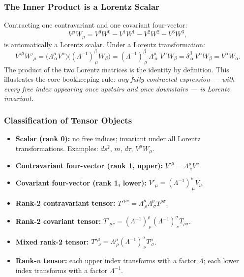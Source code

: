 \subsubsection*{The Inner Product is a Lorentz Scalar}

Contracting one contravariant and one covariant four-vector:
\begin{equation}\label{eq:lec06:inner-product}
    V^\mu W_\mu
    = V^0 W^0 - V^1 W^1 - V^2 W^2 - V^3 W^3 ,
\end{equation}
is automatically a Lorentz scalar.  Under a Lorentz transformation:
\begin{equation}\label{eq:lec06:inner-product-proof}
    V'^\mu W'_\mu
    = \bigl(\Lambda^\mu_{\ \alpha}V^\alpha\bigr)
      \bigl((\Lambda^{-1})^\beta_{\ \mu}W_\beta\bigr)
    = (\Lambda^{-1})^\beta_{\ \mu}\,\Lambda^\mu_{\ \alpha}\;V^\alpha W_\beta
    = \delta^\beta_{\ \alpha}\,V^\alpha W_\beta
    = V^\alpha W_\alpha .
\end{equation}
The product of the two Lorentz matrices is the identity by definition.  This
illustrates the core bookkeeping rule: \emph{any fully contracted expression
— with every free index appearing once upstairs and once downstairs — is
Lorentz invariant.}

\subsubsection*{Classification of Tensor Objects}

\begin{itemize}
    \item \textbf{Scalar (rank 0):} no free indices; invariant under all
      Lorentz transformations.  Examples: $ds^2$, $m$, $d\tau$,
      $V^\mu W_\mu$.
    \item \textbf{Contravariant four-vector (rank 1, upper):}
      $V'^\mu = \Lambda^\mu_{\ \nu}V^\nu$.
    \item \textbf{Covariant four-vector (rank 1, lower):}
      $V'_\mu = (\Lambda^{-1})^\nu_{\ \mu}V_\nu$.
    \item \textbf{Rank-2 contravariant tensor:}
      $T'^{\mu\nu} = \Lambda^\mu_{\ \rho}\Lambda^\nu_{\ \sigma}T^{\rho\sigma}$.
    \item \textbf{Rank-2 covariant tensor:}
      $T'_{\mu\nu}
      = (\Lambda^{-1})^\rho_{\ \mu}(\Lambda^{-1})^\sigma_{\ \nu}T_{\rho\sigma}$.
    \item \textbf{Mixed rank-2 tensor:}
      $T'^\mu_{\ \nu} = \Lambda^\mu_{\ \rho}(\Lambda^{-1})^\sigma_{\ \nu}T^\rho_{\ \sigma}$.
    \item \textbf{Rank-$n$ tensor:} each upper index transforms with a factor
      $\Lambda$; each lower index transforms with a factor $\Lambda^{-1}$.
\end{itemize}

